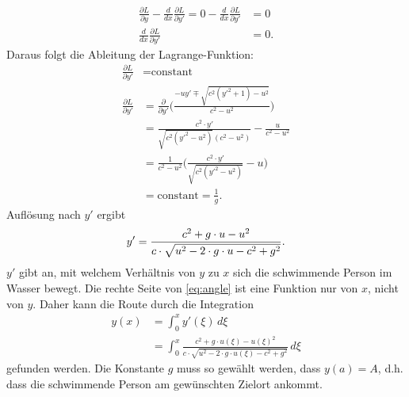 \begin{align*}
    \frac{\partial L}{\partial y} - \frac{d}{dx}\frac{\partial L}{\partial y'} = 0 - \frac{d}{dx}\frac{\partial L}{\partial y'} &= 0 \\
    \frac{d}{dx}\frac{\partial L}{\partial y'} &= 0.
\end{align*}
Daraus folgt die Ableitung der Lagrange-Funktion:
%
\begin{align*}
    \frac{\partial L}{\partial y'} &= \text{constant}
\\
    \frac{\partial L}{\partial y'} &= \frac{\partial}{\partial y'} \biggl (\frac{-uy' \mp \sqrt{c^2(y'^2+1)-u^2}}{c^2-u^2}\biggr) \\
    &= \frac{c^2\cdot y'}{\sqrt{c^2(y'^2-u^2)}(c^2-u^2)} - \frac{u}{c^2-u^2} \\
    &=  \frac{1}{c^2-u^2} \biggl( \frac{c^2\cdot y'}{\sqrt{c^2(y'^2-u^2)}} - u \biggr ) \\
    &= \text{constant} = \frac{1}{g}.
\end{align*}
Auflösung nach \(y'\) ergibt
\begin{equation}
    y' = \frac{c^2 + g\cdot u - u^2}{c \cdot \sqrt{u^2-2\cdot g\cdot u - c^2 + g^2}} .\label{eq:angle} \\
\end{equation}
\(y'\) gibt an, mit welchem Verhältnis von \(y\) zu \(x\) sich die
schwimmende Person im Wasser bewegt. Die rechte Seite von
\eqref{eq:angle} ist eine Funktion nur von \(x\), nicht von \(y\).
Daher kann die Route durch die Integration
\begin{align*}
    y(x) &= \int_0^x y'(\xi) \,d\xi \\
    &= \int_0^x \frac{c^2+g\cdot u(\xi) - u(\xi)^2}{c\cdot \sqrt{u^2 - 2\cdot g \cdot u(\xi) - c^2 + g^2}} \,d\xi
\end{align*}
gefunden werden. Die Konstante \(g\) muss so gewählt werden, dass
\(y(a) = A\), d.h. dass die schwimmende Person am gewünschten Zielort
ankommt.


